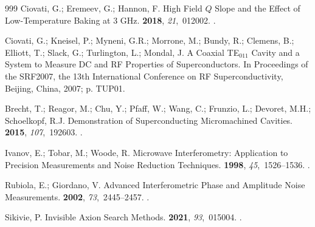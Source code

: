 \documentclass[
  aps,
  physrev,
  reprint,
  superscriptaddress,
  nofootinbib,
  amsmath,
  amssymb
]{revtex4-2}
\begin{document}
\begin{thebibliography}{999}
Ciovati, G.; Eremeev, G.; Hannon, F.
\newblock High Field {$Q$} Slope and the Effect of Low-Temperature Baking at {3
  GHz}.
 {\bf 2018}, {\em
  21},~012002.
.

Ciovati, G.; Kneisel, P.; Myneni, G.R.; Morrone, M.; Bundy, R.; Clemens, B.;
  Elliott, T.; Slack, G.; Turlington, L.; Mondal, J.
\newblock A Coaxial {TE$_{011}$} Cavity and a System to Measure {DC} and {RF}
  Properties of Superconductors.
\newblock In Proceedings of the  {SRF2007}, the 13th
  International Conference on {RF} Superconductivity, Beijing, China,  2007; p.
  TUP01.

Brecht, T.; Reagor, M.; Chu, Y.; Pfaff, W.; Wang, C.; Frunzio, L.; Devoret,
  M.H.; Schoelkopf, R.J.
\newblock Demonstration of Superconducting Micromachined Cavities.
 {\bf 2015}, {\em 107},~192603.
.

Ivanov, E.; Tobar, M.; Woode, R.
\newblock Microwave Interferometry: Application to Precision Measurements and
  Noise Reduction Techniques.
 {\bf 1998}, {\em 45},~1526--1536.
.

Rubiola, E.; Giordano, V.
\newblock Advanced Interferometric Phase and Amplitude Noise Measurements.
 {\bf 2002}, {\em
  73},~2445--2457.
.

Sikivie, P.
\newblock Invisible Axion Search Methods.
 {\bf 2021}, {\em 93},~015004.
.


\end{thebibliography}
\end{document}
